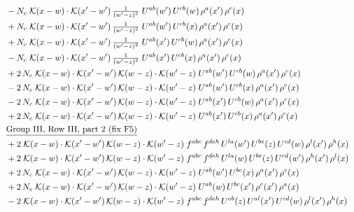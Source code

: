 \documentclass[10pt]{article}
\numberwithin{equation}{section}
\begin{document}
\begin{align}
&\quad -N_c\;\mathcal{K}(x-w)\cdot\mathcal{K}(x'-w')\,\tfrac{1}{(w'-z)^{2}}\;U^{ab}(w')\,U^{cb}(w)\,\rho^{a}(x')\,\rho^{c}(x)\notag\\
&\quad +N_c\;\mathcal{K}(x-w)\cdot\mathcal{K}(x'-w')\,\tfrac{1}{(w'-z)^{2}}\;U^{ab}(w')\,U^{cb}(x)\,\rho^{a}(x')\,\rho^{c}(x)\notag\\
&\quad +N_c\;\mathcal{K}(x-w)\cdot\mathcal{K}(x'-w')\,\tfrac{1}{(w'-z)^{2}}\;U^{ab}(x')\,U^{cb}(w)\,\rho^{a}(x')\,\rho^{c}(x)\notag\\
&\quad -N_c\;\mathcal{K}(x-w)\cdot\mathcal{K}(x'-w')\,\tfrac{1}{(w'-z)^{2}}\;U^{ab}(x')\,U^{cb}(x)\,\rho^{a}(x')\,\rho^{c}(x)\notag\\
&\quad +2\,N_c\;\mathcal{K}(x-w)\cdot\mathcal{K}(x'-w')\,\mathcal{K}(w-z)\cdot\mathcal{K}(w'-z)\;U^{ab}(w')\,U^{cb}(w)\,\rho^{a}(x')\,\rho^{c}(x)\notag\\
&\quad -2\,N_c\;\mathcal{K}(x-w)\cdot\mathcal{K}(x'-w')\,\mathcal{K}(w-z)\cdot\mathcal{K}(w'-z)\;U^{ab}(w')\,U^{cb}(x)\,\rho^{a}(x')\,\rho^{c}(x)\notag\\
&\quad -2\,N_c\;\mathcal{K}(x-w)\cdot\mathcal{K}(x'-w')\,\mathcal{K}(w-z)\cdot\mathcal{K}(w'-z)\;U^{ab}(x')\,U^{cb}(w)\,\rho^{a}(x')\,\rho^{c}(x)\notag\\
&\quad +2\,N_c\;\mathcal{K}(x-w)\cdot\mathcal{K}(x'-w')\,\mathcal{K}(w-z)\cdot\mathcal{K}(w'-z)\;U^{ab}(x')\,U^{cb}(x)\,\rho^{a}(x')\,\rho^{c}(x)\notag\\
&\quad\underline{\text{Group III, Row III, part 2 (fix F5)}}\notag\\
&\quad +2\;\mathcal{K}(x-w)\cdot\mathcal{K}(x'-w')\,\mathcal{K}(w-z)\cdot\mathcal{K}(w'-z)\;f^{abc}\,f^{deh}\,U^{la}(w')\,U^{be}(z)\,U^{cd}(w)\,\rho^{l}(x')\,\rho^{h}(x)\notag\\
&\quad +2\;\mathcal{K}(x-w)\cdot\mathcal{K}(x'-w')\,\mathcal{K}(w-z)\cdot\mathcal{K}(w'-z)\;f^{abc}\,f^{deh}\,U^{la}(w)\,U^{be}(z)\,U^{cd}(w')\,\rho^{h}(x')\,\rho^{l}(x)\notag\\
&\quad +2\,N_c\;\mathcal{K}(x-w)\cdot\mathcal{K}(x'-w')\,\mathcal{K}(w-z)\cdot\mathcal{K}(w'-z)\;U^{ab}(w')\,U^{bc}(x)\,\rho^{a}(x')\,\rho^{c}(x)\notag\\
&\quad +2\,N_c\;\mathcal{K}(x-w)\cdot\mathcal{K}(x'-w')\,\mathcal{K}(w-z)\cdot\mathcal{K}(w'-z)\;U^{ab}(w)\,U^{bc}(x')\,\rho^{c}(x')\,\rho^{a}(x)\notag\\
&\quad -2\;\mathcal{K}(x-w)\cdot\mathcal{K}(x'-w')\,\mathcal{K}(w-z)\cdot\mathcal{K}(w'-z)\;f^{abc}\,f^{deh}\,U^{eb}(z)\,U^{al}(x')\,U^{cd}(w)\,\rho^{l}(x')\,\rho^{h}(x)\notag\\

\end{align}
\end{document}
